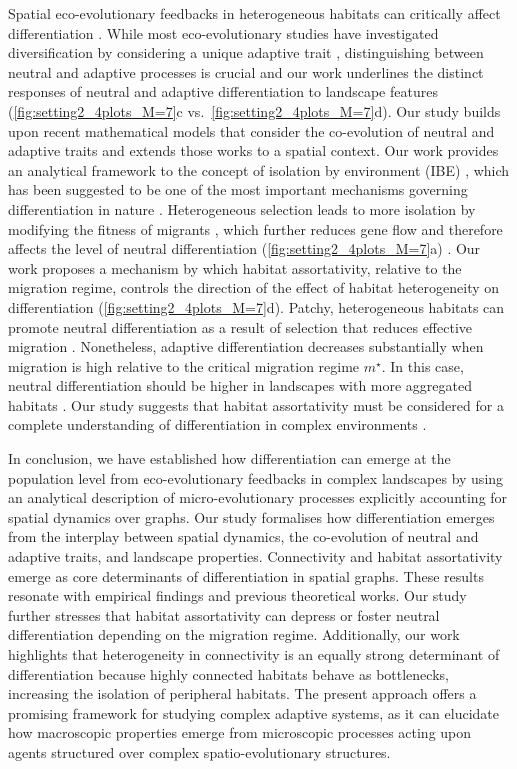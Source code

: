 Spatial eco-evolutionary feedbacks in heterogeneous habitats can critically affect differentiation \citep{Richardson2014}.
%
While most eco-evolutionary studies have investigated diversification by considering a unique adaptive trait \citep{Doebeli2003,Kirkpatrick1997,Polechova2015,Polechova2018}, distinguishing between neutral and adaptive processes is crucial \citep{Holderegger2006} and our work underlines the distinct responses of neutral and adaptive differentiation to landscape features (\cref{fig:setting2_4plots_M=7}c vs.\ \cref{fig:setting2_4plots_M=7}d).
%
Our study builds upon recent mathematical models that consider the co-evolution of neutral and adaptive traits \citep{Billiard2015,Anceschi2019} and extends those works to a spatial context. Our work provides an analytical framework to the concept of isolation by environment (IBE) \citep{Orsini2013}, which has been suggested to be one of the most important mechanisms governing differentiation in nature \citep{Wang2014}.
%
Heterogeneous selection leads to more isolation by modifying the fitness of migrants \citep{Polechova2018}, which further reduces gene flow \citep{Richardson2014} and therefore affects the level of neutral differentiation (\cref{fig:setting2_4plots_M=7}a) \citep{GARANT2007}.
%
Our work proposes a mechanism by which habitat assortativity, relative to the migration regime, controls the direction of the effect of habitat heterogeneity on differentiation (\cref{fig:setting2_4plots_M=7}d).
%
Patchy, heterogeneous habitats can promote neutral differentiation as a result of selection that reduces effective migration \citep{Stein2014}. Nonetheless, adaptive differentiation decreases substantially when migration is high relative to the critical migration regime $m^\star$. In this case, neutral differentiation should be higher in landscapes with more aggregated habitats \citep{Richardson2014}.
%
Our study suggests that habitat assortativity must be considered for a complete understanding of differentiation in complex environments \citep{Stein2014}. 

In conclusion, we have established how differentiation can emerge at the population level from eco-evolutionary feedbacks in complex landscapes by using an analytical description of micro-evolutionary processes explicitly accounting for spatial dynamics over graphs.
%
Our study formalises how differentiation emerges from the interplay between spatial dynamics, the co-evolution of neutral and adaptive traits, and landscape properties.
%
Connectivity and habitat assortativity emerge as core determinants of differentiation in spatial graphs. These results resonate with empirical findings and previous theoretical works. Our study further stresses that habitat assortativity can depress or foster neutral differentiation depending on the migration regime.
%
Additionally, our work highlights that heterogeneity in connectivity is an equally strong determinant of differentiation because highly connected habitats behave as bottlenecks, increasing the isolation of peripheral habitats.
%
The present approach offers a promising framework for studying complex adaptive systems, as it can elucidate how macroscopic properties emerge from microscopic processes acting upon agents structured over complex spatio-evolutionary structures.

